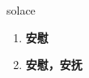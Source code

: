 
\begin{frame}
{\huge solace}
\begin{center}
\begin{enumerate}\Large
  \item \textbf{安慰}
  \item \textbf{安慰，安抚}
\end{enumerate}
\end{center}
\end{frame}
